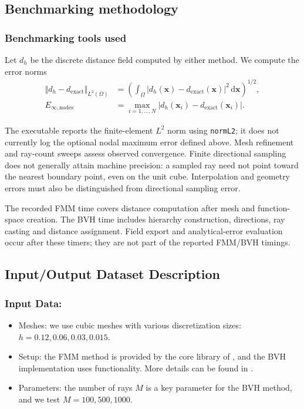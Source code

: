 \subsection{Benchmarking methodology}
\subsubsection{Benchmarking tools used}

Let $d_h$ be the discrete distance field computed by either method. We compute the error norms
\begin{subequations}
\begin{align}
  \Vert d_h - d_{\mathrm{exact}}\Vert_{L^2(\Omega)} &= \left( \int_\Omega |d_h(\mathbf{x}) - d_{\mathrm{exact}}(\mathbf{x})|^2\,\mathrm{d}\mathbf{x}
    \right)^{1/2},\\
  E_{\infty,\mathrm{nodes}} &= \max_{i=1,\dots,N} |d_h(\mathbf{x}_i) - d_{\mathrm{exact}}(\mathbf{x}_i)|.
\end{align}
\label{eq:specs:feelpp:distance:error}
\end{subequations}

The executable reports the finite-element $L^2$ norm using \texttt{normL2};
it does not currently log the optional nodal maximum error defined above.
Mesh refinement and ray-count sweeps assess observed convergence. Finite
directional sampling does not generally attain machine precision: a sampled
ray need not point toward the nearest boundary point, even on the unit cube.
Interpolation and geometry errors must also be distinguished from directional
sampling error.

The recorded FMM time covers distance computation after mesh and function-space
creation. The BVH time includes hierarchy construction, directions, ray casting
and distance assignment. Field export and analytical-error evaluation occur
after these timers; they are not part of the reported FMM/BVH timings.





\subsection{Input/Output Dataset Description}


\subsubsection{Input Data:}
  \begin{itemize}
  \item Meshes: we use cubic meshes with various discretization sizes: $h = 0.12, 0.06, 0.03, 0.015$.
  \item Setup: the FMM method is provided by the core library of \Feelpp, and the BVH implementation uses \Feelpp functionality.
    More details can be found in \cite{van_landeghem_micro-swimming_2025}.
  \item Parameters: the number of rays $M$ is a key parameter for the BVH method, and we test $M = 100, 500, 1000$.
  \end{itemize}


